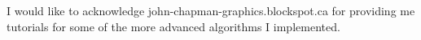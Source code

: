 \documentclass[oneside]{book}
\begin{document}
      I would like to acknowledge john-chapman-graphics.blockspot.ca for providing me tutorials for some of the more advanced algorithms I implemented.


    \nocite{*}
    {}
    
\newpage













\end{document}
